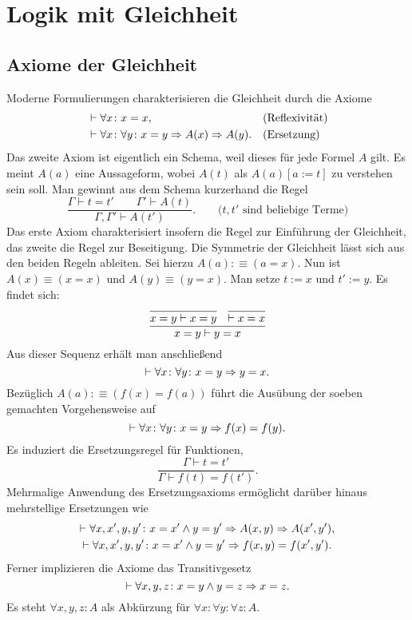 \section{Logik mit Gleichheit}

\subsection{Axiome der Gleichheit}

Moderne Formulierungen charakterisieren die Gleichheit durch die Axiome
\begin{align*}
&\vdash\forall x\colon x=x, &&\text{(Reflexivität)}\\
&\vdash\forall x\colon\forall y\colon x=y\Rightarrow A(x)\Rightarrow A(y).
&&\text{(Ersetzung)}
\end{align*}
Das zweite Axiom ist eigentlich ein Schema, weil dieses für jede
Formel $A$ gilt. Es meint $A(a)$ eine Aussageform, wobei $A(t)$ als
$A(a)[a:=t]$ zu verstehen sein soll. Man gewinnt aus dem Schema
kurzerhand die Regel
\[\dfrac{\Gamma\vdash t=t'\qquad\Gamma'\vdash A(t)}
{\Gamma,\Gamma'\vdash A(t')}.\qquad\text{($t,t'$ sind beliebige Terme)}\]
Das erste Axiom charakterisiert insofern die Regel zur Einführung
der Gleichheit, das zweite die Regel zur Beseitigung. Die Symmetrie
der Gleichheit lässt sich aus den beiden Regeln ableiten. Sei hierzu
$A(a):\equiv (a=x)$. Nun ist $A(x)\equiv (x=x)$ und
$A(y)\equiv (y=x)$. Man setze $t:=x$ und $t':=y$. Es findet sich:
\[
\infer{x=y\vdash y=x}{
  \infer{x=y\vdash x=y}{}
& \infer{\vdash x=x}{}}
\]
Aus dieser Sequenz erhält man anschließend
\[\vdash\forall x\colon\forall y\colon x=y\Rightarrow y=x.\]
Bezüglich $A(a):\equiv (f(x)=f(a))$ führt die Ausübung der soeben
gemachten Vorgehensweise auf
\[\vdash\forall x\colon\forall y\colon x=y\Rightarrow f(x)=f(y).\]
Es induziert die Ersetzungsregel für Funktionen,
\[\dfrac{\Gamma\vdash t=t'}{\Gamma\vdash f(t)=f(t')}.\]
Mehrmalige Anwendung des Ersetzungsaxioms ermöglicht darüber hinaus
mehrstellige Ersetzungen wie
\begin{gather*}
\vdash\forall x,x',y,y'\colon x=x'\land y=y'\Rightarrow A(x,y)\Rightarrow A(x',y'),\\
\vdash\forall x,x',y,y'\colon x=x'\land y=y'\Rightarrow f(x,y)=f(x',y').
\end{gather*}
Ferner implizieren die Axiome das Transitivgesetz
\[\vdash\forall x,y,z\colon x=y\land y=z\Rightarrow x=z.\]
Es steht $\forall x,y,z\colon A$ als Abkürzung für
$\forall x\colon\forall y\colon\forall z\colon A$.



